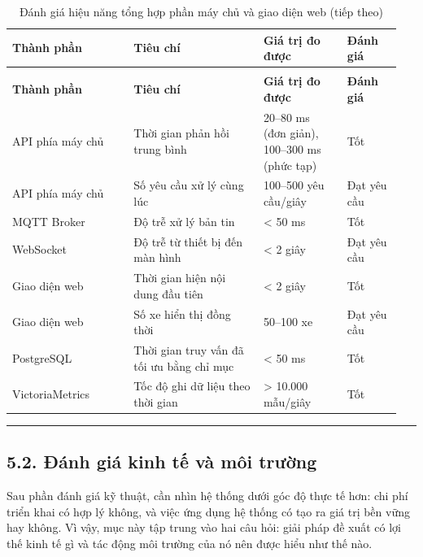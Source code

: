 \documentclass[a4paper]{extarticle}
\newcommand{\thesissettableid}[2]{%
  \renewcommand{\thetable}{#1}%
  \renewcommand{\theHtable}{#2}%
}
\begin{document}
{\thesissettableid{5.3}{tab-ch5-anh-gia-hieu-nang-tong-hop-he-thong-am-may}
\def\LTcaptype{table}
\begin{longtable}{|L{0.293\linewidth}|L{0.319\linewidth}|L{0.207\linewidth}|L{0.134\linewidth}|}
\caption{Đánh giá hiệu năng tổng hợp phần máy chủ và giao diện web}\label{tab:ch5-anh-gia-hieu-nang-tong-hop-he-thong-am-may}\\
\hline \textbf{Thành phần} & \textbf{Tiêu chí} & \textbf{Giá trị đo được} & \textbf{Đánh giá} \\
\hline
\endfirsthead
\caption[]{Đánh giá hiệu năng tổng hợp phần máy chủ và giao diện web (tiếp theo)}\\
\hline \textbf{Thành phần} & \textbf{Tiêu chí} & \textbf{Giá trị đo được} & \textbf{Đánh giá} \\
\hline
\endhead
\hline
\endfoot
\endlastfoot
API phía máy chủ & Thời gian phản hồi trung bình & 20--80 ms (đơn giản),
100--300 ms (phức tạp) & Tốt \\\hline
API phía máy chủ & Số yêu cầu xử lý cùng lúc & 100--500 yêu cầu/giây & Đạt yêu cầu \\\hline
MQTT Broker & Độ trễ xử lý bản tin & \textless{} 50 ms & Tốt \\\hline
WebSocket & Độ trễ từ thiết bị đến màn hình & \textless{} 2 giây & Đạt yêu cầu \\\hline
Giao diện web & Thời gian hiện nội dung đầu tiên & \textless{} 2 giây & Tốt \\\hline
Giao diện web & Số xe hiển thị đồng thời & 50--100 xe & Đạt yêu cầu \\\hline
PostgreSQL & Thời gian truy vấn đã tối ưu bằng chỉ mục & \textless{} 50 ms & Tốt \\\hline
VictoriaMetrics & Tốc độ ghi dữ liệu theo thời gian & \textgreater{} 10.000
mẫu/giây & Tốt \\\hline
\end{longtable}
}


\begin{center}\rule{0.5\linewidth}{0.5pt}\end{center}

\subsection{5.2. Đánh giá kinh tế và môi
trường}\label{52-ux111uxe1nh-giuxe1-kinh-tux1ebf-vuxe0-muxf4i-trux1b0ux1eddng}

Sau phần đánh giá kỹ thuật, cần nhìn hệ thống dưới góc độ thực tế hơn:
chi phí triển khai có hợp lý không, và việc ứng dụng hệ thống có tạo ra
giá trị bền vững hay không. Vì vậy, mục này tập trung vào hai câu hỏi:
giải pháp đề xuất có lợi thế kinh tế gì và tác động môi trường của nó
nên được hiểu như thế nào.
\end{document}
